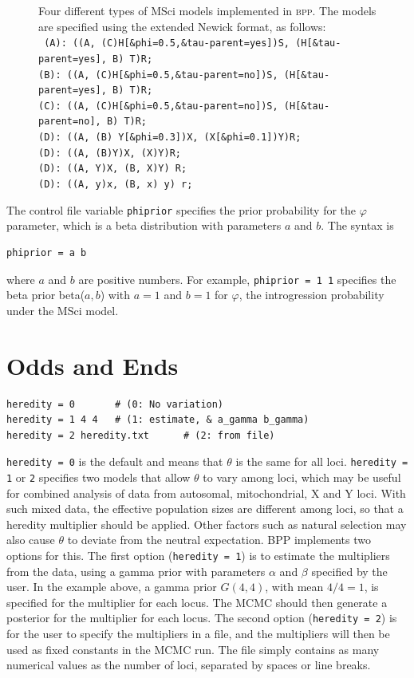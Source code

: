 \documentclass[a4paper]{book}
\numberwithin{equation}{section} \renewcommand{\baselinestretch}{0.55}
\begin{document}
\begin{figure} [t]
  \caption{Four different types of MSci models implemented in
    \textsc{bpp}.  The models are
    specified using the extended Newick format, as follows: \\
    \texttt{
      (A): ((A, (C)H[\&phi=0.5,\&tau-parent=yes])S, (H[\&tau-parent=yes], B) T)R; \\
      (B): ((A, (C)H[\&phi=0.5,\&tau-parent=no])S, (H[\&tau-parent=yes], B) T)R; \\
      (C): ((A, (C)H[\&phi=0.5,\&tau-parent=no])S, (H[\&tau-parent=no], B) T)R; \\
      (D): ((A, (B) Y[\&phi=0.3])X, (X[\&phi=0.1])Y)R; \\
      (D): ((A, (B)Y)X, (X)Y)R; \\
      (D): ((A, Y)X, (B, X)Y) R; \\
      (D): ((A, y)x, (B, x) y) r; } } \label{fig-msci-models}
\end{figure}
The control file variable \texttt{phiprior} specifies the prior
probability for the $\varphi$ parameter, which is a beta distribution
with parameters $a$ and $b$.  The syntax is
\begin{verbatim}
phiprior = a b
\end{verbatim}
where $a$ and $b$ are positive numbers. For example, \texttt{phiprior
  = 1 1} specifies the beta prior beta($a, b$) with $a = 1$ and
$b = 1$ for $\varphi$, the introgression probability under the MSci
model.


\chapter{Odds and Ends}


\begin{verbatim}
heredity = 0       # (0: No variation)
heredity = 1 4 4   # (1: estimate, & a_gamma b_gamma)
heredity = 2 heredity.txt      # (2: from file)
\end{verbatim}

\texttt{heredity = 0} is the default and means that $\theta$ is the
same for all loci. \texttt{heredity = 1} or \texttt{2} specifies two
models that allow $\theta$ to vary among loci, which may be useful for
combined analysis of data from autosomal, mitochondrial, X and Y loci.
With such mixed data, the effective population sizes are different
among loci, so that a heredity multiplier \citep[inheritance
scalars][]{Hey2004} should be applied.  Other factors such as natural
selection may also cause $\theta$ to deviate from the neutral
expectation.  \textsc{BPP} implements two options for this.  The first
option (\texttt{heredity = 1}) is to estimate the multipliers from the
data, using a gamma prior with parameters $\alpha$ and $\beta$
specified by the user.  In the example above, a gamma prior $G(4, 4)$,
with mean $4/4 = 1$, is specified for the multiplier for each locus.
The MCMC should then generate a posterior for the multiplier for each
locus.  The second option (\texttt{heredity = 2}) is for the user to
specify the multipliers in a file, and the multipliers will then be
used as fixed constants in the MCMC run.  The file simply contains as
many numerical values as the number of loci, separated by spaces or
line breaks.
\end{document}

